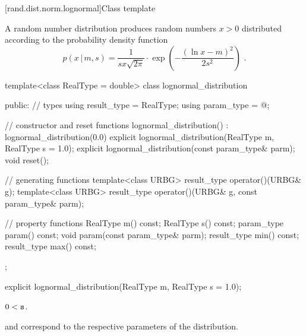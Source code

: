 
[rand.dist.norm.lognormal]{Class template }%
%
%

\pnum
A  random number distribution
produces random numbers $x > 0$
distributed according to
the probability density function%
%
%
\[ p(x\,|\,m,s) = \frac{1}{s x \sqrt{2 \pi}}
     \cdot \exp{\left(-\frac{(\ln{x} - m)^2}{2 s^2}\right)}
     \text{ .} \]

%
%
\begin{codeblock}
template<class RealType = double>
  class lognormal_distribution {
  public:
    // types
    using result_type = RealType;
    using param_type  = @\unspec@;

    // constructor and reset functions
    lognormal_distribution() : lognormal_distribution(0.0) {}
    explicit lognormal_distribution(RealType m, RealType s = 1.0);
    explicit lognormal_distribution(const param_type& parm);
    void reset();

    // generating functions
    template<class URBG>
      result_type operator()(URBG& g);
    template<class URBG>
      result_type operator()(URBG& g, const param_type& parm);

    // property functions
    RealType m() const;
    RealType s() const;
    param_type param() const;
    void param(const param_type& parm);
    result_type min() const;
    result_type max() const;
  };
\end{codeblock}


%
\begin{itemdecl}
explicit lognormal_distribution(RealType m, RealType s = 1.0);
\end{itemdecl}

\begin{itemdescr}
\pnum
\expects
$0 < \texttt{s}$.

\pnum
\remarks
{} and 
correspond to the respective parameters of the distribution.
\end{itemdescr}

